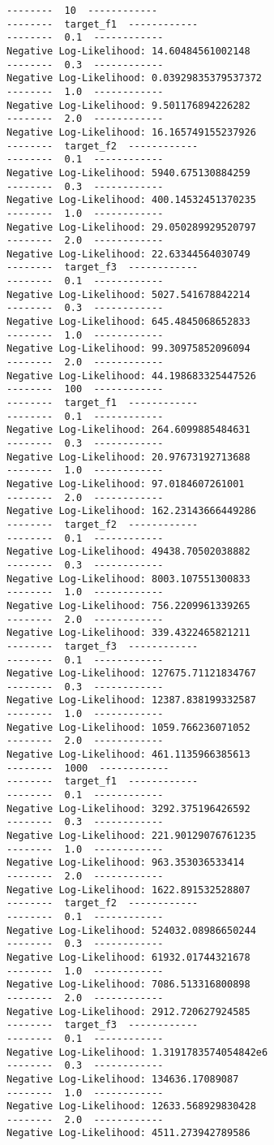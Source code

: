 \documentclass[12pt,a4paper]{article}
\begin{document}
\begin{lstlisting}
--------  10  ------------
--------  target_f1  ------------
--------  0.1  ------------
Negative Log-Likelihood: 14.60484561002148
--------  0.3  ------------
Negative Log-Likelihood: 0.03929835379537372
--------  1.0  ------------
Negative Log-Likelihood: 9.501176894226282
--------  2.0  ------------
Negative Log-Likelihood: 16.165749155237926
--------  target_f2  ------------
--------  0.1  ------------
Negative Log-Likelihood: 5940.675130884259
--------  0.3  ------------
Negative Log-Likelihood: 400.14532451370235
--------  1.0  ------------
Negative Log-Likelihood: 29.050289929520797
--------  2.0  ------------
Negative Log-Likelihood: 22.63344564030749
--------  target_f3  ------------
--------  0.1  ------------
Negative Log-Likelihood: 5027.541678842214
--------  0.3  ------------
Negative Log-Likelihood: 645.4845068652833
--------  1.0  ------------
Negative Log-Likelihood: 99.30975852096094
--------  2.0  ------------
Negative Log-Likelihood: 44.198683325447526
--------  100  ------------
--------  target_f1  ------------
--------  0.1  ------------
Negative Log-Likelihood: 264.6099885484631
--------  0.3  ------------
Negative Log-Likelihood: 20.97673192713688
--------  1.0  ------------
Negative Log-Likelihood: 97.0184607261001
--------  2.0  ------------
Negative Log-Likelihood: 162.23143666449286
--------  target_f2  ------------
--------  0.1  ------------
Negative Log-Likelihood: 49438.70502038882
--------  0.3  ------------
Negative Log-Likelihood: 8003.107551300833
--------  1.0  ------------
Negative Log-Likelihood: 756.2209961339265
--------  2.0  ------------
Negative Log-Likelihood: 339.4322465821211
--------  target_f3  ------------
--------  0.1  ------------
Negative Log-Likelihood: 127675.71121834767
--------  0.3  ------------
Negative Log-Likelihood: 12387.838199332587
--------  1.0  ------------
Negative Log-Likelihood: 1059.766236071052
--------  2.0  ------------
Negative Log-Likelihood: 461.1135966385613
--------  1000  ------------
--------  target_f1  ------------
--------  0.1  ------------
Negative Log-Likelihood: 3292.375196426592
--------  0.3  ------------
Negative Log-Likelihood: 221.90129076761235
--------  1.0  ------------
Negative Log-Likelihood: 963.353036533414
--------  2.0  ------------
Negative Log-Likelihood: 1622.891532528807
--------  target_f2  ------------
--------  0.1  ------------
Negative Log-Likelihood: 524032.08986650244
--------  0.3  ------------
Negative Log-Likelihood: 61932.01744321678
--------  1.0  ------------
Negative Log-Likelihood: 7086.513316800898
--------  2.0  ------------
Negative Log-Likelihood: 2912.720627924585
--------  target_f3  ------------
--------  0.1  ------------
Negative Log-Likelihood: 1.3191783574054842e6
--------  0.3  ------------
Negative Log-Likelihood: 134636.17089087
--------  1.0  ------------
Negative Log-Likelihood: 12633.568929830428
--------  2.0  ------------
Negative Log-Likelihood: 4511.273942789586
\end{lstlisting}
\end{document}
